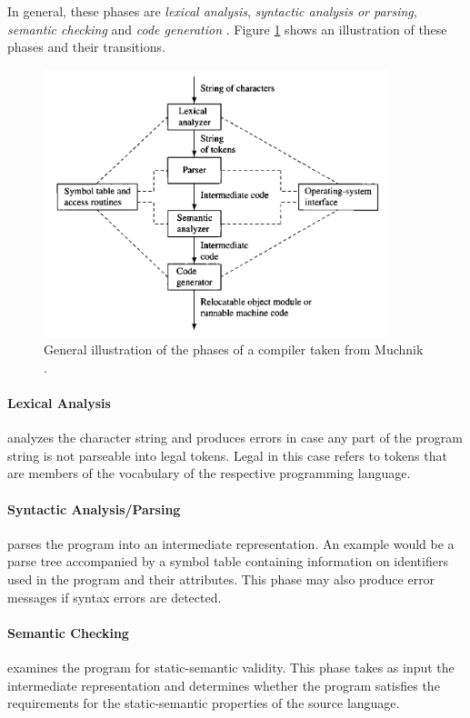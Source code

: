 \documentclass[runningheads]{llncs}
\begin{document}
In general, these phases are \textit{lexical analysis}, \textit{syntactic analysis or parsing}, \textit{semantic checking} and \textit{code generation} \cite{muchnick1997advanced}. Figure \ref{fig:compiler} shows an illustration of these phases and their transitions.

\begin{figure}[h]
\centering
\includegraphics[width=10cm]{compiler.png}
\caption{General illustration of the phases of a compiler taken from Muchnik \cite{muchnick1997advanced}.}
\label{fig:compiler}
\end{figure}

\paragraph{Lexical Analysis} analyzes the character string and produces errors in case any part of the program string is not parseable into legal tokens. Legal in this case refers to tokens that are members of the vocabulary of the respective programming language.

\paragraph{Syntactic Analysis/Parsing} parses the program into an intermediate representation. An example would be a parse tree accompanied by a symbol table containing information on identifiers used in the program and their attributes. This phase may also produce error messages if syntax errors are detected.

\paragraph{Semantic Checking} examines the program for static-semantic validity. This phase takes as input the intermediate representation and determines whether the program satisfies the requirements for the static-semantic properties of the source language.
\end{document}
